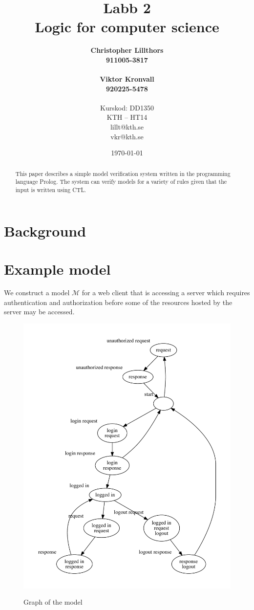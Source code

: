 \documentclass[a4paper,11pt]{article}
\title{Labb 2 \\ Logic for computer science}
\author{
  {\bf Christopher Lillthors}\\
  \textbf{911005-3817} \\\\
  {\bf Viktor Kronvall}\\
  \textbf{920225-5478}\\
  \\
  Kurskod: DD1350\\
  KTH -- HT14\\
  lillt@kth.se\\
  vkr@kth.se
}
\date{\today}
\begin{document}


\maketitle
\thispagestyle{empty}
\begin{abstract}

This paper describes a simple model verification system written in the programming language Prolog.
The system can verify models for a variety of rules given that the input is written using CTL.
\end{abstract}
\renewcommand{\arraystretch}{1.2}
\newpage
\thispagestyle{empty}
\tableofcontents
\newpage
\clearpage
\setcounter{page}{1}

\section{Background}

\newpage

\section{Example model}
We construct a model $\mathcal{M}$ for a web client that is accessing a server which requires authentication and authorization
before some of the resources hosted by the server may be accessed.
\begin{figure}[ht]
\caption{Graph of the model}
\includegraphics[scale=0.6]{model.pdf}
\label{fig:graph}
\end{figure}
\end{document}
